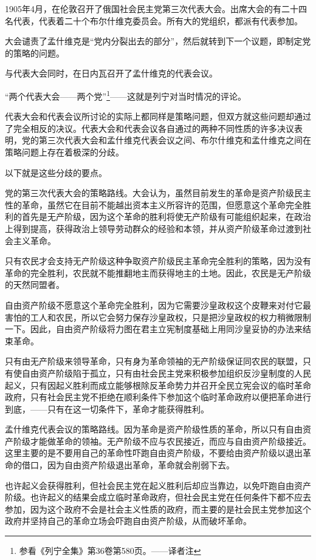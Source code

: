 1905年4月，在伦敦召开了俄国社会民主党第三次代表大会。出席大会的有二十四名代表，代表着二十个布尔什维克委员会。所有大的党组织，都派有代表参加。

大会谴责了孟什维克是“党内分裂出去的部分”，然后就转到下一个议题，即制定党的策略的问题。

与代表大会同时，在日内瓦召开了孟什维克的代表会议。

“两个代表大会——两个党”\footnote{参看《列宁全集》第36卷第580页。——译者注}——这就是列宁对当时情况的评论。

代表大会和代表会议所讨论的实际上都同样是策略问题，但双方就这些问题却通过了完全相反的决议。代表大会和代表会议各自通过的两种不同性质的许多决议表明，党的第三次代表大会和孟什维克代表会议之间、布尔什维克和孟什维克之间在策略问题上存在着极深的分歧。

以下就是这些分歧的要点。

党的第三次代表大会的策略路线。大会认为，虽然目前发生的革命是资产阶级民主性的革命，虽然它在目前不能越出资本主义所容许的范围，但愿意这个革命完全胜利的首先是无产阶级，因为这个革命的胜利将使无产阶级有可能组织起来，在政治上得到提高，获得政治上领导劳动群众的经验和本领，并从资产阶级革命过渡到社会主义革命。

只有农民才会支持无产阶级这种争取资产阶级民主革命完全胜利的策略，因为没有革命的完全胜利，农民就不能推翻地主而获得地主的土地。因此，农民是无产阶级的天然同盟者。

自由资产阶级不愿意这个革命完全胜利，因为它需要沙皇政权这个皮鞭来对付它最害怕的工人和农民，所以它会努力保存沙皇政权，只是把沙皇政权的权力稍微限制一下。因此，自由资产阶级将力图在君主立宪制度基础上用同沙皇妥协的办法来结束革命。

只有由无产阶级来领导革命，只有身为革命领袖的无产阶级保证同农民的联盟，只有使自由资产阶级陷于孤立，只有由社会民主党来积极参加组织反沙皇制度的人民起义，只有因起义胜利而成立能够根除反革命势力并召开全民立宪会议的临时革命政府，只有社会民主党不拒绝在顺利条件下参加这个临时革命政府以便把革命进行到底，——只有在这一切条件下，革命才能获得胜利。

孟什维克代表会议的策略路线。因为革命是资产阶级性质的革命，所以只有自由资产阶级才能做革命的领袖。无产阶级不应与农民接近，而应与自由资产阶级接近。这里主要的是不要用自己的革命性吓跑自由资产阶级，不要给由资产阶级以退出革命的借口，因为自由资产阶级退出革命，革命就会削弱下去。

也许起义会获得胜利，但社会民主党在起义胜利后却应当靠边，以免吓跑自由资产阶级。也许起义的结果会成立临时革命政府，但社会民主党在任何条件下都不应去参加，因为这个政府不会是社会主义性质的政府，而主要的是社会民主党参加这个政府并坚持自己的革命立场会吓跑自由资产阶级，从而破坏革命。

